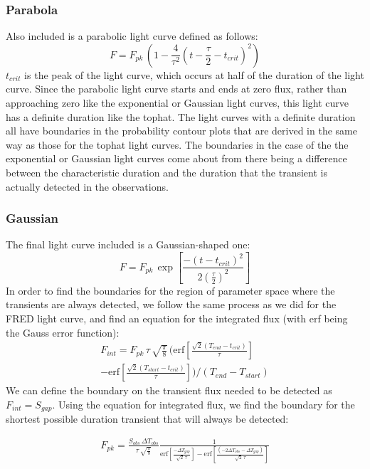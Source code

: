 \documentclass[12pt]{article}
\begin{document}
\subsubsection{Parabola}
Also included is a parabolic light curve defined as follows:
\[F = F_{pk}\,\left(1 - \frac{4}{\tau^2}\left(t - \frac{\tau}{2} - t_{crit}\right)^2\right)\]
$t_{crit}$ is the peak of the light curve, which occurs at half of the duration of the light curve. Since the parabolic light curve starts and ends at zero flux, rather than approaching zero like the exponential or Gaussian light curves, this light curve has a definite duration like the tophat. The light curves with a definite duration all have boundaries in the probability contour plots that are derived in the same way as those for the tophat light curves. The boundaries in the case of the the exponential or Gaussian light curves come about from there being a difference between the characteristic duration and the duration that the transient is actually detected in the observations. 
\subsubsection{Gaussian}
The final light curve included is a Gaussian-shaped one:
\[F=F_{pk}\,\exp\left[\frac{-(t-t_{crit})^2}{2\left(\frac{\tau}{2}\right)^2}\right]\]
In order to find the boundaries for the region of parameter space where the transients are always detected, we follow the same process as we did for the FRED light curve, and find an equation for the integrated flux (with erf being the Gauss error function): 
\begin{equation*}
\begin{split}
    F_{int} = F_{pk}\,\tau\,\sqrt{\frac{\pi}{8}}\,(\text{erf}\left[\frac{\sqrt{2}(T_{end}-t_{crit})}{\tau}\right]\\
    -\text{erf}\left[\frac{\sqrt{2}(T_{start}-t_{crit})}{\tau}\right])/(T_{end}-T_{start})
\end{split}
\end{equation*}
We can define the boundary on the transient flux needed to be detected as $F_{int}=S_{gap}$.
Using the equation for integrated flux, we find the boundary for the shortest possible duration transient that will always be detected:

\begin{equation*}
\begin{split}
    F_{pk} = \frac{S_{obs}\,\Delta T_{obs}}{\tau\, \sqrt{\frac{\pi}{8}}}\frac{1}{\text{erf}\left[\frac{-\Delta T_{gap}}{\sqrt{2}\,\tau}\right] - \text{erf}\left[\frac{(-2\Delta T_{obs} - \Delta T_{gap})}{\sqrt{2}\,\tau}\right]}
\end{split}
\end{equation*}
\end{document}
